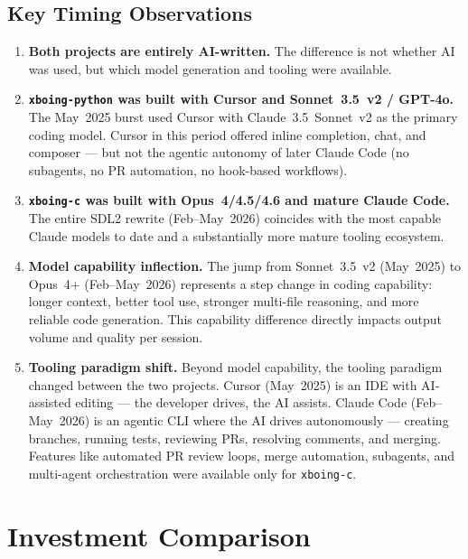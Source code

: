 \documentclass[a4paper,10pt]{article}
\newcommand{\repo}[1]{\texttt{#1}}
\begin{document}
\subsection{Key Timing Observations}

\begin{enumerate}
  \item \textbf{Both projects are entirely AI-written.}  The
    difference is not whether AI was used, but which model generation
    and tooling were available.

  \item \textbf{\repo{xboing-python} was built with Cursor and
    Sonnet~3.5~v2 / GPT-4o.}  The May~2025 burst used Cursor with
    Claude~3.5~Sonnet~v2 as the primary coding model.  Cursor in
    this period offered inline completion, chat, and composer ---
    but not the agentic autonomy of later Claude Code (no
    subagents, no PR automation, no hook-based workflows).

  \item \textbf{\repo{xboing-c} was built with Opus~4/4.5/4.6
    and mature Claude Code.}  The entire SDL2 rewrite
    (Feb--May~2026) coincides with the most capable Claude models
    to date and a substantially more mature tooling ecosystem.

  \item \textbf{Model capability inflection.}  The jump from
    Sonnet~3.5~v2 (May~2025) to Opus~4+ (Feb--May~2026) represents
    a step change in coding capability: longer context, better
    tool use, stronger multi-file reasoning, and more reliable
    code generation.  This capability difference directly impacts
    output volume and quality per session.

  \item \textbf{Tooling paradigm shift.}  Beyond model capability,
    the tooling paradigm changed between the two projects.  Cursor
    (May~2025) is an IDE with AI-assisted editing --- the developer
    drives, the AI assists.  Claude Code (Feb--May~2026) is an
    agentic CLI where the AI drives autonomously --- creating
    branches, running tests, reviewing PRs, resolving comments,
    and merging.  Features like automated PR review loops, merge
    automation, subagents, and multi-agent orchestration were
    available only for \repo{xboing-c}.
\end{enumerate}

\section{Investment Comparison}
\end{document}
